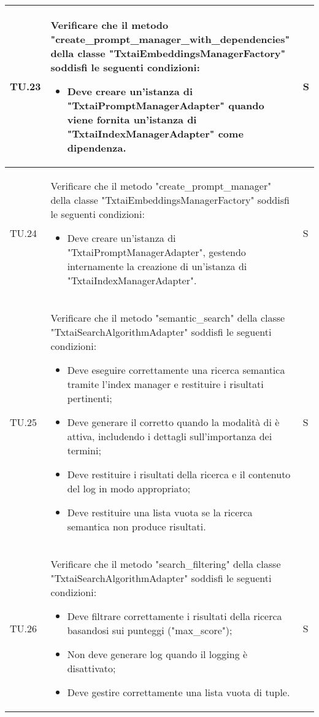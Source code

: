 \begin{adjustwidth}{-0.5cm}{-0.5cm}
\begin{longtable}{|P{1.5cm}|>{\raggedright}P{9.5cm}|>{\arraybackslash}P{1.5cm}|}
		\hline TU.23 & Verificare che il metodo "create\_prompt\_manager\_with\_dependencies" della classe "TxtaiEmbeddingsManagerFactory" soddisfi le seguenti condizioni:
		\begin{itemize}
			\item Deve creare un'istanza di "TxtaiPromptManagerAdapter" quando viene fornita un'istanza di "TxtaiIndexManagerAdapter" come dipendenza.
		\end{itemize} & S \\

		\hline TU.24 & Verificare che il metodo "create\_prompt\_manager" della classe "TxtaiEmbeddingsManagerFactory" soddisfi le seguenti condizioni:
		\begin{itemize}
			\item Deve creare un'istanza di "TxtaiPromptManagerAdapter", gestendo internamente la creazione di un'istanza di "TxtaiIndexManagerAdapter".
		\end{itemize} & S \\

		\hline TU.25 & Verificare che il metodo "semantic\_search" della classe "TxtaiSearchAlgorithmAdapter" soddisfi le seguenti condizioni:
		\begin{itemize}
			\item Deve eseguire correttamente una ricerca semantica tramite l'index manager e restituire i risultati pertinenti;
			\item Deve generare il  corretto quando la modalità di  è attiva, includendo i dettagli sull'importanza dei termini;
			\item Deve restituire i risultati della ricerca e il contenuto del log in modo appropriato;
   			\item Deve restituire una lista vuota se la ricerca semantica non produce risultati.
		\end{itemize} & S \\

		\hline TU.26 & Verificare che il metodo "search\_filtering" della classe "TxtaiSearchAlgorithmAdapter" soddisfi le seguenti condizioni:
		\begin{itemize}
			\item Deve filtrare correttamente i risultati della ricerca basandosi sui punteggi ("max\_score");
			\item Non deve generare log quando il logging è disattivato;
   			\item Deve gestire correttamente una lista vuota di tuple.
		\end{itemize} & S \\


\end{longtable}
\end{adjustwidth}
